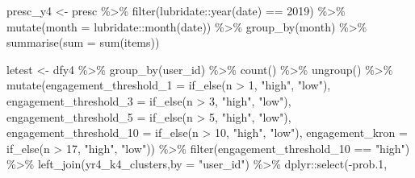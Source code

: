 \documentclass[
]{article}
\newenvironment{Shaded}{\begin{snugshade}}{\end{snugshade}}
\newcommand{\AttributeTok}[1]{\textcolor[rgb]{0.77,0.63,0.00}{#1}}
\newcommand{\DecValTok}[1]{\textcolor[rgb]{0.00,0.00,0.81}{#1}}
\newcommand{\FloatTok}[1]{\textcolor[rgb]{0.00,0.00,0.81}{#1}}
\newcommand{\FunctionTok}[1]{\textcolor[rgb]{0.00,0.00,0.00}{#1}}
\newcommand{\NormalTok}[1]{#1}
\newcommand{\OtherTok}[1]{\textcolor[rgb]{0.56,0.35,0.01}{#1}}
\newcommand{\SpecialCharTok}[1]{\textcolor[rgb]{0.00,0.00,0.00}{#1}}
\newcommand{\StringTok}[1]{\textcolor[rgb]{0.31,0.60,0.02}{#1}}
\begin{document}
\begin{Shaded}
\begin{Highlighting}[]
\NormalTok{ presc\_y4 }\OtherTok{\textless{}{-}}\NormalTok{ presc }\SpecialCharTok{\%\textgreater{}\%} 
   \FunctionTok{filter}\NormalTok{(lubridate}\SpecialCharTok{::}\FunctionTok{year}\NormalTok{(date) }\SpecialCharTok{==} \DecValTok{2019}\NormalTok{) }\SpecialCharTok{\%\textgreater{}\%}
   \FunctionTok{mutate}\NormalTok{(}\AttributeTok{month =}\NormalTok{ lubridate}\SpecialCharTok{::}\FunctionTok{month}\NormalTok{(date)) }\SpecialCharTok{\%\textgreater{}\%} 
   \FunctionTok{group\_by}\NormalTok{(month) }\SpecialCharTok{\%\textgreater{}\%} 
   \FunctionTok{summarise}\NormalTok{(}\AttributeTok{sum =} \FunctionTok{sum}\NormalTok{(items))}


\NormalTok{ letest }\OtherTok{\textless{}{-}}\NormalTok{  dfy4 }\SpecialCharTok{\%\textgreater{}\%}
   \FunctionTok{group\_by}\NormalTok{(user\_id) }\SpecialCharTok{\%\textgreater{}\%}
   \FunctionTok{count}\NormalTok{() }\SpecialCharTok{\%\textgreater{}\%}
   \FunctionTok{ungroup}\NormalTok{() }\SpecialCharTok{\%\textgreater{}\%} 
   \FunctionTok{mutate}\NormalTok{(}\AttributeTok{engagement\_threshold\_1 =} \FunctionTok{if\_else}\NormalTok{(n }\SpecialCharTok{\textgreater{}} \DecValTok{1}\NormalTok{, }\StringTok{"high"}\NormalTok{, }\StringTok{"low"}\NormalTok{),}
          \AttributeTok{engagement\_threshold\_3 =} \FunctionTok{if\_else}\NormalTok{(n }\SpecialCharTok{\textgreater{}} \DecValTok{3}\NormalTok{, }\StringTok{"high"}\NormalTok{, }\StringTok{"low"}\NormalTok{),}
          \AttributeTok{engagement\_threshold\_5 =} \FunctionTok{if\_else}\NormalTok{(n }\SpecialCharTok{\textgreater{}} \DecValTok{5}\NormalTok{, }\StringTok{"high"}\NormalTok{, }\StringTok{"low"}\NormalTok{),}
          \AttributeTok{engagement\_threshold\_10 =} \FunctionTok{if\_else}\NormalTok{(n }\SpecialCharTok{\textgreater{}} \DecValTok{10}\NormalTok{, }\StringTok{"high"}\NormalTok{, }\StringTok{"low"}\NormalTok{),}
          \AttributeTok{engagement\_kron =} \FunctionTok{if\_else}\NormalTok{(n }\SpecialCharTok{\textgreater{}} \DecValTok{17}\NormalTok{, }\StringTok{"high"}\NormalTok{, }\StringTok{"low"}\NormalTok{)) }\SpecialCharTok{\%\textgreater{}\%} 
   \FunctionTok{filter}\NormalTok{(engagement\_threshold\_10 }\SpecialCharTok{==} \StringTok{"high"}\NormalTok{) }\SpecialCharTok{\%\textgreater{}\%} 
   \FunctionTok{left\_join}\NormalTok{(yr4\_k4\_clusters,}\AttributeTok{by =} \StringTok{"user\_id"}\NormalTok{) }\SpecialCharTok{\%\textgreater{}\%} 
\NormalTok{   dplyr}\SpecialCharTok{::}\FunctionTok{select}\NormalTok{(}\SpecialCharTok{{-}}\NormalTok{prob}\FloatTok{.1}\NormalTok{,}

\end{Highlighting}
\end{Shaded}
\end{document}
